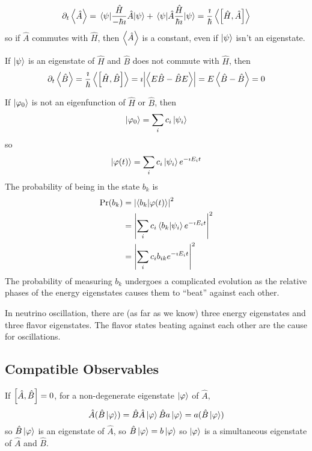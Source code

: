 \documentclass[a4paper,twoside,master.tex]{subfiles}
\begin{document}
\begin{equation}
    \partial_t \ev{\hat{A}} = \ev{\frac{\hat{H}}{- \hbar \imath} \hat{A}}{\psi} + \ev{\hat{A} \frac{\hat{H}}{\hbar \imath}}{\psi} = \frac{\imath}{\hbar} \ev{\comm{\hat{H}}{\hat{A}}}
\end{equation}
so if $ \hat{A} $ commutes with $ \hat{H} $, then $ \ev{\hat{A}} $ is a constant, even if $\ket{\psi} $ isn't an eigenstate.

If $\ket{\psi} $ is an eigenstate of $ \hat{H} $ and $ \hat{B} $ does not commute with $ \hat{H} $, then
\begin{equation}
    \partial_t \ev{\hat{B}} = \frac{\imath}{\hbar} \ev{\comm{\hat{H}}{\hat{B}}} = \imath \abs{\ev{E \hat{B} - \hat{B} E}} = E \ev{\hat{B} - \hat{B}} = 0
\end{equation}

If $\ket{\varphi_0} $ is not an eigenfunction of $ \hat{H} $ or $ \hat{B} $, then
\begin{equation}
    \ket{\varphi_0} = \sum_i c_i\ket{\psi_i}
\end{equation}
so
\begin{equation}
    \ket{\varphi(t)} = \sum_i c_i\ket{\psi_i} e^{- \imath E_i t}
\end{equation}
The probability of being in the state $ b_k $ is
\begin{align}
    \Pr(b_k) &= \abs{\bra{b_k}\ket{\varphi(t)}}^2\\
    &= \abs{\sum_i c_i\bra{b_k}\ket{\psi_i} e^{- \imath E_i t}}^2\\
    &= \abs{\sum_i c_i b_{ik} e^{- \imath E_i t}}^2
\end{align}
The probability of measuring $ b_k $ undergoes a complicated evolution as the relative phases of the energy eigenstates causes them to ``beat'' against each other.
\begin{ex}
    In neutrino oscillation, there are (as far as we know) three energy eigenstates and three flavor eigenstates. The flavor states beating against each other are the cause for oscillations.
\end{ex}

\subsection{Compatible Observables}
\label{sub:compatible_observables}

If $ \comm{\hat{A}}{\hat{B}} = 0 $, for a non-degenerate eigenstate $\ket{\varphi} $ of $ \hat{A} $,
\begin{equation}
    \hat{A}(\hat{B}\ket{\varphi}) = \hat{B} \hat{A}\ket{\varphi} \hat{B} a\ket{\varphi} = a (\hat{B}\ket{\varphi})
\end{equation}
so $ \hat{B}\ket{\varphi} $ is an eigenstate of $ \hat{A} $, so $ \hat{B}\ket{\varphi} = b\ket{\varphi} $ so $\ket{\varphi} $ is a simultaneous eigenstate of $ \hat{A} $ and $ \hat{B} $.
\end{document}
